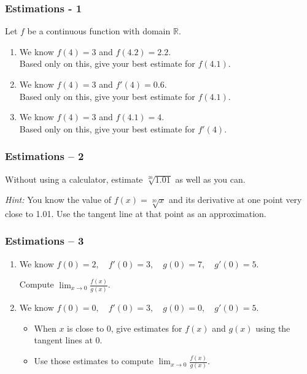 \begin{frame}
	\frametitle{Estimations - 1}

	Let $f$ be a continuous function with domain $\mathbb{R}$.

	\vfill

	\begin{enumerate}
		\item We know $f(4)=3$ and $f(4.2)=2.2$. \\ Based only on this, give your best
			estimate for $f(4.1)$.
			\vfill

		\item We know $f(4)=3$ and $f'(4)=0.6$. \\ Based only on this, give your best
			estimate for $f(4.1)$.
			\vfill

		\item We know $f(4)=3$ and $f(4.1) = 4$. \\ Based only on this, give your best
			estimate for $f'(4)$.
	\end{enumerate}

	\vfill
\end{frame}

\begin{frame}
	\frametitle{Estimations -- 2}

	Without using a calculator, estimate $\displaystyle \sqrt[20]{1.01}$ as well as
	you can.

	\emph{Hint:} You know the value of $\displaystyle f(x) = \sqrt[20]{x}$ and its
	derivative at one point very close to 1.01. Use the tangent line at that point
	as an approximation.
\end{frame}

\begin{frame}[t]
	\fontsize{13}{13}\selectfont
	\frametitle{Estimations -- 3}


	\begin{enumerate}
		\item We know \quad $\displaystyle f(0) = 2, \quad f'(0) = 3, \quad g(0) = 7,
			\quad g'(0) = 5.$

			\vspace{.2cm}
			Compute \; $\displaystyle \lim_{x \to 0}\frac{f(x)}{g(x)}$.

			\vfill

		\item We know \quad $\displaystyle f(0) = 0, \quad f'(0) = 3, \quad g(0) = 0,
			\quad g'(0) = 5.$

			\vspace{.2cm}
			\begin{itemize}
				\item When $x$ is close to $0$, give estimates for $\displaystyle f(x)$
					and $\displaystyle g(x)$ using the tangent lines at $0$.

				\item Use those estimates to compute \; $\displaystyle \lim_{x \to 0}\frac{f(x)}{g(x)}$.
			\end{itemize}
	\end{enumerate}

	\vfill
\end{frame}

